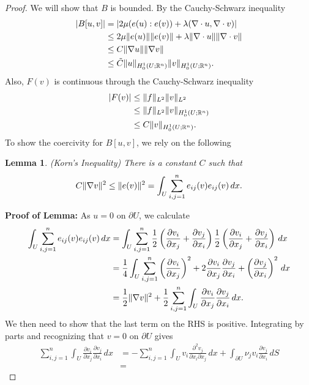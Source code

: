 \documentclass{article}
\DeclarePairedDelimiter{\norm}{\lVert}{\rVert}
\newtheorem{lemma}[theorem]{Lemma}
\begin{document}
\begin{flushleft}
\begin{proof}
We will show that $B$ is bounded. By the Cauchy-Schwarz inequality
\begin{align*}
    |B[u,v]| & = \left|2\mu(e(u):e(v))+\lambda(\nabla\cdot u, \nabla \cdot v)\right|  \\&\le
    2\mu\norm{e(u)}\norm{e(v)} + \lambda\norm{\nabla\cdot u}\norm{\nabla\cdot v} \\&\le
    C\norm{\nabla u}\norm{\nabla v}\\&\le
    \tilde{C}\norm{u}_{H_0^1(U;\mathbb R^n)}\norm{v}_{H_0^1(U;\mathbb R^n)}.
\end{align*}
Also, $F(v)$ is continuous through the Cauchy-Schwarz inequality
\begin{align*}
    |F(v)|&\le \norm{f}_{L^2}\norm{v}_{L^2} \\&\le
    \norm{f}_{L^2}\norm{v}_{H_0^1(U;\mathbb R^n)} \\&\le
    C\norm{v}_{H_0^1(U;\mathbb R^n)}.
\end{align*}
To show the coercivity for $B[u,v]$, we rely on the following
\begin{lemma}
(Korn's Inequality) There is a constant $C$ such that
$$C\norm{\nabla v}^2 \le \norm{e(v)}^2=\int_U \sum_{i,j=1}^n e_{ij}(v)e_{ij}(v)\,dx.$$
\end{lemma}
\textbf{Proof of Lemma:} As $u=0$ on $\partial U$, we calculate
\begin{align*}
\int_U \sum_{i,j=1}^n e_{ij}(v)e_{ij}(v)\,dx &=
\int_U \sum_{i,j=1}^n \frac{1}{2}\left(\frac{\partial v_i}{\partial x_j} + \frac{\partial v_j}{\partial x_i}\right)\frac{1}{2}\left(\frac{\partial v_i}{\partial x_j} + \frac{\partial v_j}{\partial x_i}\right)\,dx\\&=
\frac{1}{4}\int_U \sum_{i,j=1}^n \left(\frac{\partial v_i}{\partial x_j}\right)^2+2\frac{\partial v_i}{\partial x_j}\frac{\partial v_j}{\partial x_i}+ \left(\frac{\partial v_j}{\partial x_i}\right)^2\,dx\\&=
\frac{1}{2}\norm{\nabla v}^2 +\frac{1}{2}\sum_{i,j=1}^n\int_U \frac{\partial v_i}{\partial x_j}\frac{\partial v_j}{\partial x_i}\,dx.
\end{align*}
We then need to show that the last term on the RHS is positive. Integrating by parts and recognizing that $v=0$ on $\partial U$ gives
\begin{align*}
 \sum_{i,j=1}^n\int_U \frac{\partial v_i}{\partial x_j}\frac{\partial v_j}{\partial x_i}\,dx &=
 -\sum_{i,j=1}^n\int_U v_i\frac{\partial^2 v_j}{\partial x_i \partial x_j}\,dx + \int_{\partial U} \nu_j v_i \frac{\partial v_j}{\partial x_i}\,dS\\&=

\end{align*}
\end{proof}
\end{flushleft}
\end{document}
